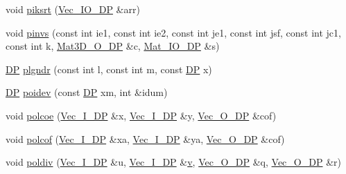 \begin{DoxyCompactItemize}
\item 
void \mbox{\hyperlink{namespaceNR_a11f36d67ab2adaed64b8f5dbfbbf2efc}{piksrt}} (\mbox{\hyperlink{namespaceNR_ab293e06a6bf799d8a7ed932b6852bcb8}{Vec\+\_\+\+I\+O\+\_\+\+DP}} \&arr)
\item 
void \mbox{\hyperlink{namespaceNR_a34209b0a9d44aa222a5f76c3c7bdeeaa}{pinvs}} (const int ie1, const int ie2, const int je1, const int jsf, const int jc1, const int k, \mbox{\hyperlink{namespaceNR_a74d09ea99e0452b529d2eb055cb09108}{Mat3\+D\+\_\+\+O\+\_\+\+DP}} \&c, \mbox{\hyperlink{namespaceNR_ad1513aa4697878ed3bff0b8b3c9dd910}{Mat\+\_\+\+I\+O\+\_\+\+DP}} \&s)
\item 
\mbox{\hyperlink{namespaceNR_af6ff762dd605ff477b8e52387253a02a}{DP}} \mbox{\hyperlink{namespaceNR_a677f4e9cdd801b4a29b667ac6915ac26}{plgndr}} (const int l, const int m, const \mbox{\hyperlink{namespaceNR_af6ff762dd605ff477b8e52387253a02a}{DP}} x)
\item 
\mbox{\hyperlink{namespaceNR_af6ff762dd605ff477b8e52387253a02a}{DP}} \mbox{\hyperlink{namespaceNR_a0612378e73208e941cd53484771f52bb}{poidev}} (const \mbox{\hyperlink{namespaceNR_af6ff762dd605ff477b8e52387253a02a}{DP}} xm, int \&idum)
\item 
void \mbox{\hyperlink{namespaceNR_a404e4e04344a84403f08fcd906a91b2d}{polcoe}} (\mbox{\hyperlink{namespaceNR_a9f943da53862537c552e2a770cb170ae}{Vec\+\_\+\+I\+\_\+\+DP}} \&x, \mbox{\hyperlink{namespaceNR_a9f943da53862537c552e2a770cb170ae}{Vec\+\_\+\+I\+\_\+\+DP}} \&y, \mbox{\hyperlink{namespaceNR_a970094d23441f8ef6a45282a7eb2103d}{Vec\+\_\+\+O\+\_\+\+DP}} \&cof)
\item 
void \mbox{\hyperlink{namespaceNR_af2c475d479fbaa639b53b606796608c6}{polcof}} (\mbox{\hyperlink{namespaceNR_a9f943da53862537c552e2a770cb170ae}{Vec\+\_\+\+I\+\_\+\+DP}} \&xa, \mbox{\hyperlink{namespaceNR_a9f943da53862537c552e2a770cb170ae}{Vec\+\_\+\+I\+\_\+\+DP}} \&ya, \mbox{\hyperlink{namespaceNR_a970094d23441f8ef6a45282a7eb2103d}{Vec\+\_\+\+O\+\_\+\+DP}} \&cof)
\item 
void \mbox{\hyperlink{namespaceNR_a2ec54779e5505f4a702196d44766e022}{poldiv}} (\mbox{\hyperlink{namespaceNR_a9f943da53862537c552e2a770cb170ae}{Vec\+\_\+\+I\+\_\+\+DP}} \&u, \mbox{\hyperlink{namespaceNR_a9f943da53862537c552e2a770cb170ae}{Vec\+\_\+\+I\+\_\+\+DP}} \&\mbox{\hyperlink{hadron__timeslice_8cc_a716fc87f5e814be3ceee2405ed6ff22a}{v}}, \mbox{\hyperlink{namespaceNR_a970094d23441f8ef6a45282a7eb2103d}{Vec\+\_\+\+O\+\_\+\+DP}} \&q, \mbox{\hyperlink{namespaceNR_a970094d23441f8ef6a45282a7eb2103d}{Vec\+\_\+\+O\+\_\+\+DP}} \&r)

\end{DoxyCompactItemize}
